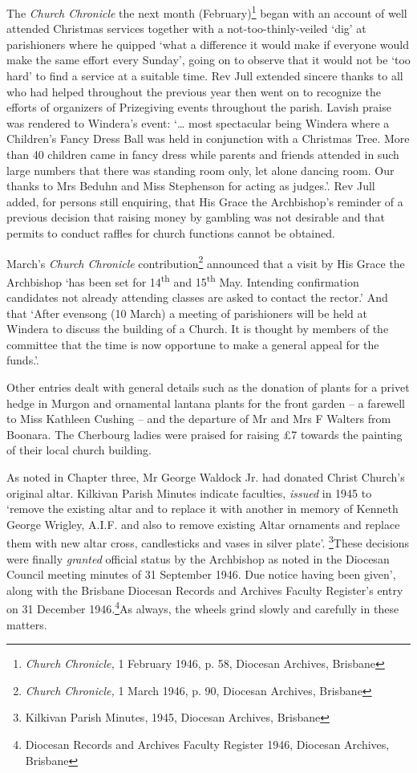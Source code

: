 The \emph{Church Chronicle} the next month (February)\footnote{\emph{Church Chronicle,} 1 February 1946, p. 58, Diocesan Archives, Brisbane} began with an account of well attended Christmas services together with a not-too-thinly-veiled `dig' at parishioners where he quipped `what a difference it would make if everyone would make the same effort every Sunday', going on to observe that it would not be `too hard' to find a service at a suitable time. Rev Jull extended sincere thanks to all who had helped throughout the previous year then went on to recognize the efforts of organizers of Prizegiving events throughout the parish. Lavish praise was rendered to Windera's event: `\ldots{} most spectacular being Windera where a Children's Fancy Dress Ball was held in conjunction with a Christmas Tree. More than 40 children came in fancy dress while parents and friends attended in such large numbers that there was standing room only, let alone dancing room. Our thanks to Mrs Beduhn and Miss Stephenson for acting as judges.'. Rev Jull added, for persons still enquiring, that His Grace the Archbishop's reminder of a previous decision that raising money by gambling was not desirable and that permits to conduct raffles for church functions cannot be obtained.

March's \emph{Church Chronicle} contribution\footnote{\emph{Church Chronicle,} 1 March 1946, p. 90, Diocesan Archives, Brisbane} announced that a visit by His Grace the Archbishop `has been set for 14\textsuperscript{th} and 15\textsuperscript{th} May. Intending confirmation candidates not already attending classes are asked to contact the rector.' And that `After evensong (10 March) a meeting of parishioners will be held at Windera to discuss the building of a Church. It is thought by members of the committee that the time is now opportune to make a general appeal for the funds.'.

Other entries dealt with general details such as the donation of plants for a privet hedge in Murgon and ornamental lantana plants for the front garden -- a farewell to Miss Kathleen Cushing -- and the departure of Mr and Mrs F Walters from Boonara. The Cherbourg ladies were praised for raising £7 towards the painting of their local church building.

As noted in Chapter three, Mr George Waldock Jr. had donated Christ Church's original altar. Kilkivan Parish Minutes indicate faculties, \emph{issued} in 1945 to `remove the existing altar and to replace it with another in memory of Kenneth George Wrigley, A.I.F. and also to remove existing Altar ornaments and replace them with new altar cross, candlesticks and vases in silver plate'. \footnote{Kilkivan Parish Minutes, 1945, Diocesan Archives, Brisbane}These decisions were finally \emph{granted} official status by the Archbishop as noted in the Diocesan Council meeting minutes of 31 September 1946. Due notice having been given', along with the Brisbane Diocesan Records and Archives Faculty Register's entry on 31 December 1946.\footnote{Diocesan Records and Archives Faculty Register 1946, Diocesan Archives, Brisbane}As always, the wheels grind slowly and carefully in these matters.


